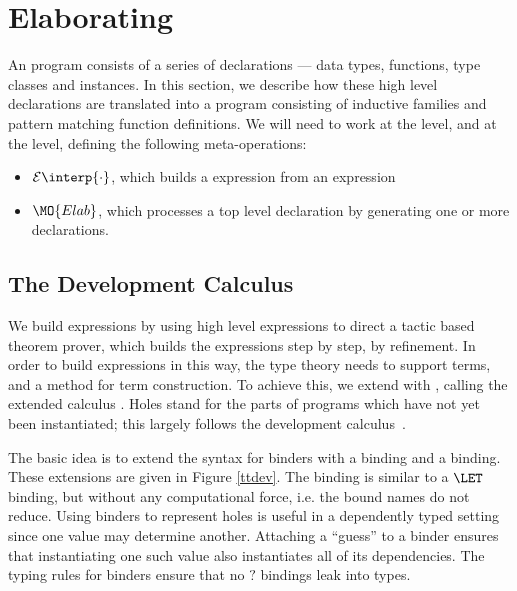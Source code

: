 \newcommand{\ttinterp}[1]{\mathcal{E}\interp{#1}}

\section{Elaborating \Idris{}}

An \Idris{} program consists of a series of declarations --- data types, functions,
type classes and instances. In this section, we describe how these high level declarations
are translated into a \TT{} program consisting of inductive families and pattern matching
function definitions. We will need to work at the  level, and at
the  level, defining the following meta-operations:

\begin{itemize}
\item $\ttinterp{\cdot}$, which builds a \TT{} expression from an \Idris{} expression
\item $\MO{Elab}$, which processes a top level \Idris{} declaration by generating
one or more \TT{} declarations.
\end{itemize}

\subsection{The Development Calculus \TTdev}

We build \TT{} expressions by using high level \Idris{} expressions to
direct a tactic based theorem prover, which builds the \TT{} expressions
step by step, by refinement. In order to build expressions in this way,
the type theory needs to support
 terms, and a method for term construction. 
To achieve this, we extend \TT{} with ,
calling the extended calculus \TTdev{}.
Holes stand for the parts of programs which have not yet been
instantiated; this largely follows the \Oleg{} development
calculus~\cite{McBride1999}.

The basic idea is to extend the syntax for binders with a 
binding and a  binding. 
These extensions are given in Figure \ref{ttdev}.
The  binding is
similar to a $\LET$ binding, but without any computational force,
i.e. the bound names do not reduce.
Using binders to represent holes is useful in a dependently typed setting since
one value may determine another. Attaching a ``guess'' to a binder ensures that
instantiating one such value also instantiates all of its dependencies. The
typing rules for binders ensure that no $?$ bindings leak into types.

